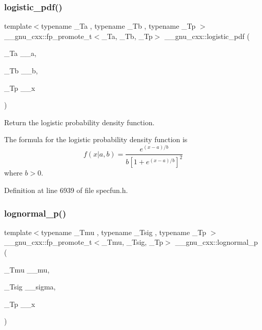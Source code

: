 \subsubsection{\texorpdfstring{logistic\+\_\+pdf()}{logistic\_pdf()}}
{\footnotesize\ttfamily template$<$typename \+\_\+\+Ta , typename \+\_\+\+Tb , typename \+\_\+\+Tp $>$ \\
\+\_\+\+\_\+gnu\+\_\+cxx\+::fp\+\_\+promote\+\_\+t$<$\+\_\+\+Ta, \+\_\+\+Tb, \+\_\+\+Tp$>$ \+\_\+\+\_\+gnu\+\_\+cxx\+::logistic\+\_\+pdf (\begin{DoxyParamCaption}\item[{\+\_\+\+Ta}]{\+\_\+\+\_\+a,  }\item[{\+\_\+\+Tb}]{\+\_\+\+\_\+b,  }\item[{\+\_\+\+Tp}]{\+\_\+\+\_\+x }\end{DoxyParamCaption})\hspace{0.3cm}{\ttfamily [inline]}}



Return the logistic probability density function. 

The formula for the logistic probability density function is \[ f(x| a, b) = \frac{e^{(x - a)/b}}{b[1 + e^{(x - a)/b}]^2} \] where $b > 0$. 

Definition at line 6939 of file specfun.\+h.

\mbox{\label{group__gnu__math__spec__func_ga3bbd4feb10f2d745bf8aca8748099c53}} 
\subsubsection{\texorpdfstring{lognormal\+\_\+p()}{lognormal\_p()}}
{\footnotesize\ttfamily template$<$typename \+\_\+\+Tmu , typename \+\_\+\+Tsig , typename \+\_\+\+Tp $>$ \\
\+\_\+\+\_\+gnu\+\_\+cxx\+::fp\+\_\+promote\+\_\+t$<$\+\_\+\+Tmu, \+\_\+\+Tsig, \+\_\+\+Tp$>$ \+\_\+\+\_\+gnu\+\_\+cxx\+::lognormal\+\_\+p (\begin{DoxyParamCaption}\item[{\+\_\+\+Tmu}]{\+\_\+\+\_\+mu,  }\item[{\+\_\+\+Tsig}]{\+\_\+\+\_\+sigma,  }\item[{\+\_\+\+Tp}]{\+\_\+\+\_\+x }\end{DoxyParamCaption})\hspace{0.3cm}{\ttfamily [inline]}}



